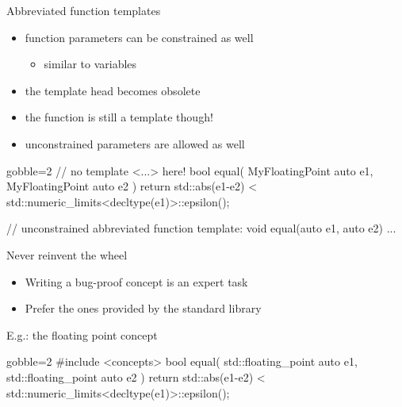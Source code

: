 \begin{frame}[fragile]
    \begin{block}{Abbreviated function templates}
      \begin{itemize}
        \item function parameters can be constrained as well
        \begin{itemize}
          \item similar to variables
        \end{itemize}
        \item the template head becomes obsolete
        \item the function is still a template though!
        \item unconstrained  parameters are allowed as well
      \end{itemize}
    \end{block}
    \begin{exampleblock}{}
      \small
      \begin{cppcode*}{gobble=2}
      // no template <...> here!
      bool equal( MyFloatingPoint auto e1,
                  MyFloatingPoint auto e2 ) {
        return std::abs(e1-e2) <
               std::numeric_limits<decltype(e1)>::epsilon();
      }

      // unconstrained abbreviated function template:
      void equal(auto e1, auto e2) { ... }
      \end{cppcode*}
    \end{exampleblock}
\end{frame}

\begin{frame}[fragile]
    \begin{block}{Never reinvent the wheel}
      \begin{itemize}
        \item Writing a bug-proof concept is an expert task
        \item Prefer the ones provided by the standard library
      \end{itemize}
    \end{block}
    \begin{exampleblock}{E.g.: the floating point concept}
      \small
      \begin{cppcode*}{gobble=2}
      #include <concepts>
      bool equal( std::floating_point auto e1,
                  std::floating_point auto e2 ) {
        return std::abs(e1-e2) <
               std::numeric_limits<decltype(e1)>::epsilon();
      }
      \end{cppcode*}
    \end{exampleblock}
\end{frame}

